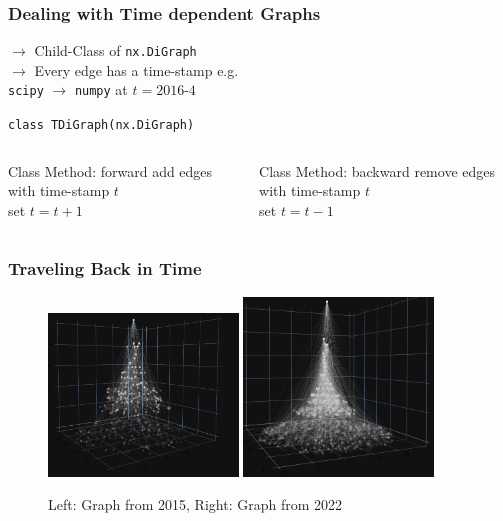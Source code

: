 \documentclass[fleqn]{beamer}
\begin{document}
    \begin{frame}
        \frametitle{Dealing with Time dependent Graphs}
            \centering $\to$\;\; Child-Class of \texttt{nx.DiGraph}\\
            \centering $\to$\;\; Every edge has a time-stamp e.g.\\
            \vspace{0.5cm}
            \centering \hspace{0.5cm} \texttt{scipy} $\rightarrow$
            \texttt{numpy} at $t = \text{2016-4}$
            \vspace{1cm}

            \centering \texttt{class TDiGraph(nx.DiGraph)}
        \begin{columns}[T]
        \begin{block}{\centering Class Method: forward}
            \centering add edges with time-stamp $t$\\
            \centering set $t = t + 1$
        \end{block}
        \begin{block}{\centering Class Method: backward }
            \centering remove edges with time-stamp $t$\\
            \centering set $t = t - 1$
        \end{block}
        \end{columns}
    \end{frame}

    \begin{frame}
        \frametitle{Traveling Back in Time}
        \begin{figure}[htpb]
            \centering
            \includegraphics[width=0.45\textwidth]{./pics/plot_2015.png}
            \includegraphics[width=0.45\textwidth]{./pics/plot_sqrt.png}
            \caption{Left: Graph from 2015, Right: Graph from 2022}
        \end{figure}
    \end{frame}
\end{document}
